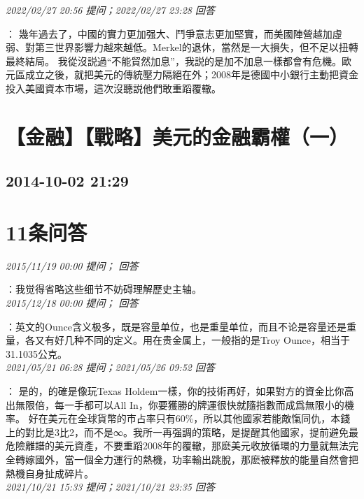 \documentclass[twocolumn]{ctexart}
\begin{document}
\textit{\hfill\noindent\small 2022/02/27 20:56 提问；2022/02/27 23:28 回答}

：
幾年過去了，中國的實力更加强大、鬥爭意志更加堅實，而美國陣營越加虛弱、對第三世界影響力越來越低。Merkel的退休，當然是一大損失，但不足以扭轉最終結局。
我從沒説過“不能貿然加息”，我説的是加不加息一樣都會有危機。歐元區成立之後，就把美元的傳統壓力隔絕在外；2008年是德國中小銀行主動把資金投入美國資本市場，這次沒聽説他們敢重蹈覆轍。
\\


\section{【金融】【戰略】美元的金融霸權（一）}
\subsection{2014-10-02 21:29}


\section{11条问答}

\textit{\hfill\noindent\small 2015/11/19 00:00 提问； 回答}

：我觉得省略这些细节不妨碍理解歷史主轴。\\

\textit{\hfill\noindent\small 2015/12/18 00:00 提问； 回答}

：英文的Ounce含义极多，既是容量单位，也是重量单位，而且不论是容量还是重量，各又有好几种不同的定义。用在贵金属上，一般指的是Troy Ounce，相当于31.1035公克。\\

\textit{\hfill\noindent\small 2021/05/21 06:28 提问；2021/05/26 09:52 回答}

：
是的，的確是像玩Texas Holdem一樣，你的技術再好，如果對方的資金比你高出無限倍，每一手都可以All In，你要獲勝的牌運很快就隨指數而成爲無限小的機率。
好在美元在全球貨幣的市占率只有60\%，所以其他國家若能敵愾同仇，本錢上的對比是3比2，而不是∞。我所一再强調的策略，是提醒其他國家，提前避免最危險離譜的美元資產，不要重蹈2008年的覆轍，那麽美元收放循環的力量就無法完全轉嫁國外，當一個全力運行的熱機，功率輸出跳脫，那麽被釋放的能量自然會把熱機自身扯成碎片。
\\

\textit{\hfill\noindent\small 2021/10/21 15:33 提问；2021/10/21 23:35 回答}
\end{document}
